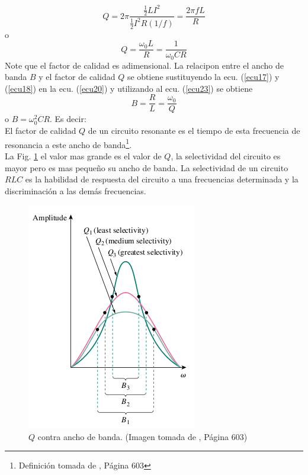\documentclass[twocolumn]{IEEEtran}
\begin{document}
\begin{equation}
 Q = 2\pi \frac{{\frac{1}{2}L{I^2}}}{{\frac{1}{2}{I^2}R\left( {1/f} \right)}} = \frac{{2\pi fL}}{R}
\label{ecu22}
\end{equation}
\noindent o
\begin{equation}
 Q = \frac{\omega _0 L}{R} = \frac{1}{\omega _0 CR}
\label{ecu23}
\end{equation}
\noindent
Note que el factor de calidad es adimensional. La relacipon entre el ancho de banda $B$ y el factor de calidad $Q$ se obtiene sustituyendo la ecu. (\ref{ecu17}) y (\ref{ecu18}) en la ecu. (\ref{ecu20}) y utilizando al ecu. (\ref{ecu23}) se obtiene
\begin{equation}
 B = \frac{R}{L} = \frac{\omega _0}{Q}
\label{ecu24}
\end{equation}
\noindent o $B = \omega ^{2} _0 C R$. Es decir:\\
El factor de calidad $Q$  de un circuito resonante es el tiempo de esta frecuencia de resonancia a este ancho de banda\footnote{Definición tomada de \cite{sadiku}, Página 603}.\\
La Fig. \ref{fig4} el valor mas grande es el valor de $Q$, la selectividad del circuito es mayor pero es mas pequeño su ancho de banda. La selectividad de un circuito $RLC$ es la habilidad de respuesta del circuito a una frecuencias determinada y la discriminación a las demás frecuencias.
\begin{figure}[H]
	\centering
		\includegraphics[scale=0.75]{resonancia.png}
	\caption{$Q$ contra ancho de banda. (Imagen tomada de \cite{sadiku}, Página 603)}
	\label{fig4}
\end{figure}
\end{document}
